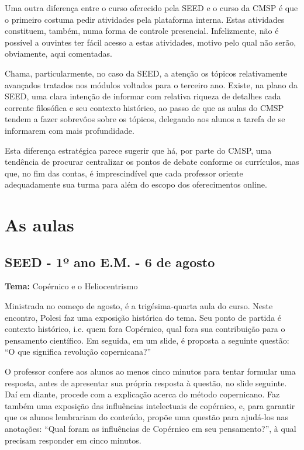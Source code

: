 \documentclass[12pt,a4paper]{article}
\begin{document}
    	Uma outra diferença entre o curso oferecido pela SEED e o curso 
    	da CMSP é que o primeiro costuma pedir atividades pela plataforma 
    	interna. Estas atividades constituem, também, numa forma de controle 
    	presencial. Infelizmente, não é possível a ouvintes ter fácil acesso 
    	a estas atividades, motivo pelo qual não serão, obviamente, aqui 
    	comentadas. 

	Chama, particularmente, no caso da SEED, a atenção os tópicos 
	relativamente avançados tratados nos módulos voltados para o 
	terceiro ano. Existe, na plano da SEED, uma clara intenção de 
	informar com relativa riqueza de detalhes cada corrente filosófica 
	e seu contexto histórico, ao passo de que as aulas do CMSP tendem 
	a fazer sobrevôos sobre os tópicos, delegando aos alunos a tarefa 
	de se informarem com mais profundidade. 

	Esta diferença estratégica parece sugerir que há, por parte do 
	CMSP, uma tendência de procurar centralizar os pontos de debate 
	conforme os currículos, mas que, no fim das contas, é imprescindível 
	que cada professor oriente adequadamente sua turma para além do 
	escopo dos oferecimentos online.   

	\newpage
	
	\section{As aulas}

	\subsection{SEED - 1º ano E.M. - 6 de agosto}

	\textbf{Tema:} Copérnico e o Heliocentrismo

	Ministrada no começo de agosto, é a trigésima-quarta aula do curso. 
	Neste encontro, Polesi faz uma exposição histórica do tema. Seu 
	ponto de partida é contexto histórico, i.e. quem fora Copérnico, 
	qual fora sua contribuição para o pensamento científico. Em seguida, 
	em um slide, é proposta a seguinte questão: “O que significa revolução 
	copernicana?” 

	O professor confere aos alunos ao menos cinco minutos para tentar 
	formular uma resposta, antes de apresentar sua própria resposta à 
	questão, no slide seguinte. Daí em diante, procede com a explicação 
	acerca do método copernicano. Faz também uma exposição das influências 
	intelectuais de copérnico, e, para garantir que os alunos lembrariam 
	do conteúdo, propõe uma questão para ajudá-los nas anotações: “Qual 
	foram as influências de Copérnico em seu pensamento?”, à qual precisam 
	responder em cinco minutos. 
\end{document}

